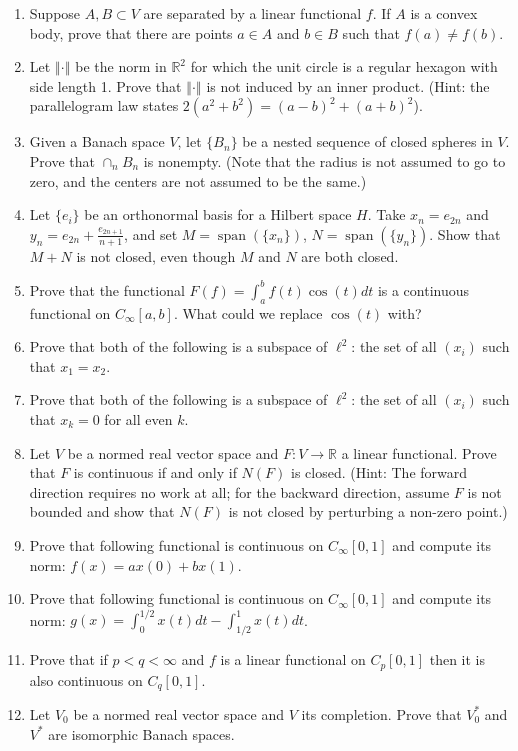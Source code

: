 \documentclass[12pt,letterpaper,reqno]{amsart}
\newcommand{\R}{\mathbb R}
\newcommand{\Norm}[1]{\left\Vert #1 \right \Vert}
\renewcommand{\span}{\operatorname{span}}
\begin{document}
\begin{enumerate}[1.]
\begin{flushleft}
\end{flushleft}
\item Suppose $A,B\subset V$ are separated by a linear functional $f$. If $A$ is a convex body, prove that there are points $a\in A$ and $b\in B$ such that $f(a)\neq f(b)$.
\item Let $\Norm{\cdot}$ be the norm in $\R^2$ for which the unit circle is a regular hexagon with side length 1. Prove that $\Norm{\cdot}$ is not induced by an inner product. (Hint: the parallelogram law states  $2(a^2+b^2)=(a-b)^2+(a+b)^2$).
\item Given a Banach space $V$, let $\{B_n\}$ be a nested sequence of closed spheres in $V$. Prove that $\cap_n B_n$ is nonempty. (Note that the radius is not assumed to go to zero, and the centers are not assumed to be the same.)
\item Let $\{e_i\}$ be an orthonormal basis for a Hilbert space $H$. Take $x_n=e_{2n}$ and $y_n=e_{2n}+\frac{e_{2n+1}}{n+1}$, and set $M=\span(\{x_n\})$, $N=\span(\{y_n\})$. Show that $M+N$ is not closed, even though $M$ and $N$ are both closed.
\item Prove that the functional $F(f)=\int_a^b f(t) \cos(t)dt$ is a continuous functional on $C_\infty[a,b]$. What could we replace $\cos(t)$ with?
\item Prove that both of the following is a subspace of $\ell^2$: the set of all $(x_i)$ such that $x_1=x_2$.
\item Prove that both of the following is a subspace of $\ell^2$: the set of all $(x_i)$ such that  $x_k=0$ for all even $k$.
\item Let $V$ be a normed real vector space and $F: V\rightarrow \R$ a linear functional. Prove that $F$ is continuous if and only if $N(F)$ is closed. (Hint: The forward direction requires no work at all; for the backward direction, assume $F$ is not bounded and show that $N(F)$ is not closed by perturbing a non-zero point.)
\item Prove that  following functional is continuous on $C_\infty[0,1]$ and compute its norm: $f(x)=ax(0)+bx(1)$.
\item Prove that  following functional is continuous on $C_\infty[0,1]$ and compute its norm: $g(x)=\int_0^{1/2}x(t)dt - \int_{1/2}^1 x(t)dt$.
\item Prove that if $p<q<\infty$ and $f$ is a linear functional on $C_p[0,1]$ then it is also continuous on $C_q[0,1]$.
\item Let $V_0$ be a normed real vector space and $V$ its completion. Prove that $V_0^*$ and $V^*$ are  isomorphic  Banach spaces.

\end{enumerate}
\end{document}
